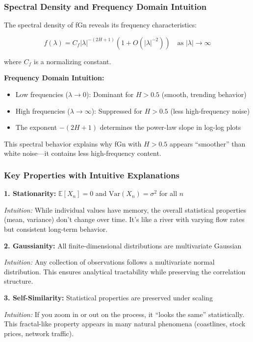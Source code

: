 \documentclass[11pt,a4paper]{article}
\begin{document}
\subsubsection{Spectral Density and Frequency Domain Intuition}

The spectral density of fGn reveals its frequency characteristics:

\begin{equation}
f(\lambda) = C_f |\lambda|^{-(2H+1)} \left(1 + O(|\lambda|^{-2})\right) \quad \text{as } |\lambda| \to \infty
\end{equation}

where $C_f$ is a normalizing constant.

\textbf{Frequency Domain Intuition:}
\begin{itemize}
    \item Low frequencies ($\lambda \to 0$): Dominant for $H > 0.5$ (smooth, trending behavior)
    \item High frequencies ($\lambda \to \infty$): Suppressed for $H > 0.5$ (less high-frequency noise)
    \item The exponent $-(2H+1)$ determines the power-law slope in log-log plots
\end{itemize}

This spectral behavior explains why fGn with $H > 0.5$ appears ``smoother'' than white noise—it contains less high-frequency content.

\subsubsection{Key Properties with Intuitive Explanations}

\textbf{1. Stationarity:} $\mathbb{E}[X_n] = 0$ and $\text{Var}(X_n) = \sigma^2$ for all $n$

\emph{Intuition:} While individual values have memory, the overall statistical properties (mean, variance) don't change over time. It's like a river with varying flow rates but consistent long-term behavior.

\textbf{2. Gaussianity:} All finite-dimensional distributions are multivariate Gaussian

\emph{Intuition:} Any collection of observations follows a multivariate normal distribution. This ensures analytical tractability while preserving the correlation structure.

\textbf{3. Self-Similarity:} Statistical properties are preserved under scaling

\emph{Intuition:} If you zoom in or out on the process, it ``looks the same'' statistically. This fractal-like property appears in many natural phenomena (coastlines, stock prices, network traffic).
\end{document}
